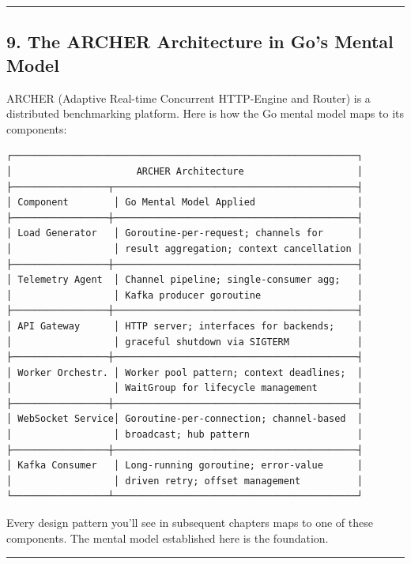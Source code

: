 \documentclass[
]{article}
\begin{document}
\begin{center}\rule{0.5\linewidth}{0.5pt}\end{center}

\hypertarget{the-archer-architecture-in-gos-mental-model}{%
\subsection{9. The ARCHER Architecture in Go's Mental
Model}\label{the-archer-architecture-in-gos-mental-model}}

ARCHER (Adaptive Real-time Concurrent HTTP-Engine and Router) is a
distributed benchmarking platform. Here is how the Go mental model maps
to its components:

\begin{verbatim}
┌─────────────────────────────────────────────────────────────┐
│                      ARCHER Architecture                    │
├─────────────────┬───────────────────────────────────────────┤
│ Component        │ Go Mental Model Applied                  │
├─────────────────┼───────────────────────────────────────────┤
│ Load Generator   │ Goroutine-per-request; channels for      │
│                  │ result aggregation; context cancellation │
├─────────────────┼───────────────────────────────────────────┤
│ Telemetry Agent  │ Channel pipeline; single-consumer agg;   │
│                  │ Kafka producer goroutine                 │
├─────────────────┼───────────────────────────────────────────┤
│ API Gateway      │ HTTP server; interfaces for backends;    │
│                  │ graceful shutdown via SIGTERM            │
├─────────────────┼───────────────────────────────────────────┤
│ Worker Orchestr. │ Worker pool pattern; context deadlines;  │
│                  │ WaitGroup for lifecycle management       │
├─────────────────┼───────────────────────────────────────────┤
│ WebSocket Service│ Goroutine-per-connection; channel-based  │
│                  │ broadcast; hub pattern                   │
├─────────────────┼───────────────────────────────────────────┤
│ Kafka Consumer   │ Long-running goroutine; error-value      │
│                  │ driven retry; offset management          │
└─────────────────┴───────────────────────────────────────────┘
\end{verbatim}

Every design pattern you'll see in subsequent chapters maps to one of
these components. The mental model established here is the foundation.

\begin{center}\rule{0.5\linewidth}{0.5pt}\end{center}
\end{document}
